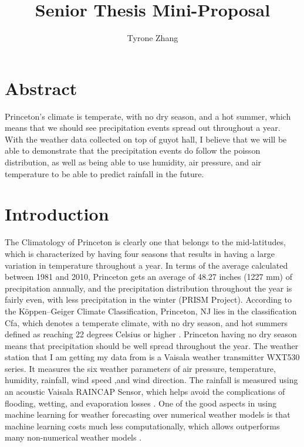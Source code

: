 \documentclass[12pt]{article}
\begin{document}
	\title{Senior Thesis Mini-Proposal}
	\author{Tyrone Zhang}
	\maketitle
	\section{Abstract}
	Princeton’s climate is temperate, with no dry season, and a hot summer, which means that we should see precipitation events spread out throughout a year. With the weather data collected on top of guyot hall, I believe that we will be able to demonstrate that the precipitation events do follow the poisson distribution, as well as being able to use humidity, air pressure, and air temperature to be able to predict rainfall in the future. 
	
	\section{Introduction}
	The Climatology of Princeton is clearly one that belongs to the mid-latitudes, which is characterized by having four seasons that results in having a large variation in temperature throughout a year. In terms of the average calculated between 1981 and 2010, Princeton gets an average of 48.27 inches (1227 mm) of precipitation annually, and the precipitation distribution throughout the year is fairly even, with less precipitation in the winter (PRISM Project).  According to the Köppen–Geiger Climate Classification, Princeton, NJ lies in the classification Cfa, which denotes a temperate climate, with no dry season, and hot summers defined as reaching 22 degrees Celsius or higher \cite{Peel2008}. Princeton having no dry season means that precipitation should be well spread throughout the year. The weather station that I am getting my data from is a Vaisala weather transmitter WXT530 series. It measures the six weather parameters of air pressure, temperature, humidity, rainfall, wind speed ,and wind direction. The rainfall is measured using an acoustic Vaisala RAINCAP Sensor, which helps avoid the complications of flooding, wetting, and evaporation losses \cite{Vaisala}. One of the good aspects in using machine learning for weather forecasting over numerical weather models is that machine learning costs much less computationally, which allows outperforms many non-numerical weather models \cite{Scher}. 
	
\end{document}
